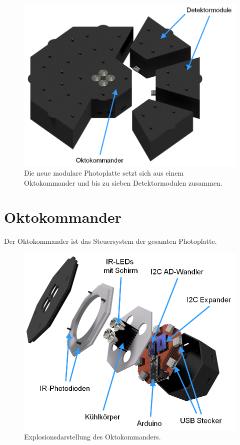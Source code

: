 ﻿\documentclass{sciposter}
\begin{document}
\begin{multicols}{3}
\begin{figure}[h]
	\centering
	\includegraphics[scale=1.2]{../CAD_Bilder/Gestikulaser/Gestikulaser_beschriftet.png}
	\caption{Die neue modulare Photoplatte setzt sich aus einem Oktokommander und bis zu sieben Detektormodulen zusammen.}
	\label{fig:PhotoplatteAlpha}
\end{figure}


\section{Oktokommander}
\noindent
Der Oktokommander ist das Steuersystem der gesamten Photoplatte.

\begin{figure}[h]
	\centering
	\includegraphics[scale=1.2]{../CAD_Bilder/Oktokommander/Oktokommander_beschriftet.png}
	\caption{Explosionsdarstellung des Oktokommanders.}
	\label{fig:Oktokommander}
\end{figure}


\end{multicols}
\end{document}
